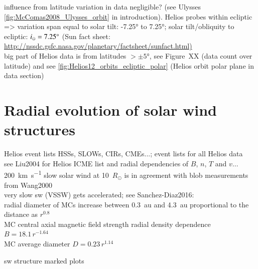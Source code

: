 influence from latitude variation in data negligible? (see Ulysses \autoref{fig:McComas2008_Ulysses_orbit} in introduction). Helios probes within ecliptic => variation span equal to solar tilt: -7.25° to 7.25°; solar tilt/obliquity to ecliptic: $i_\odot = 7.25\degree$ (Sun fact sheet: \url{http://nssdc.gsfc.nasa.gov/planetary/factsheet/sunfact.html)}\\
big part of Helios data is from latitudes $>\pm5$°, see Figure~XX (data count over latitude) and see \autoref{fig:Helios12_orbits_ecliptic_polar} (Helios orbit polar plane in data section)\\


\section{Radial evolution of solar wind structures}

Helios event lists HSSs, SLOWs, CIRs, CMEs...; event lists for all Helios data\\
see Liu2004 for Helios ICME list and radial dependencies of $B$, $n$, $T$ and $v$...\\

\SI{200}{\km\per\s} slow solar wind at 10~$R_\odot$ is in agreement with blob measurements from Wang2000\\

very slow sw (VSSW) gets accelerated; see Sanchez-Diaz2016:\\


radial diameter of MCs increase between 0.3~au and 4.3~au proportional to the distance as $r^{0.8}$ \citep{Bothmer1998}\\
MC central axial magnetic field strength radial density dependence $B = 18.1\,r^{-1.64}$ \citet{Leitner2007}\\
MC average diameter $D = 0.23\,r^{1.14}$ \citet{Leitner2007}

sw structure marked plots\\

